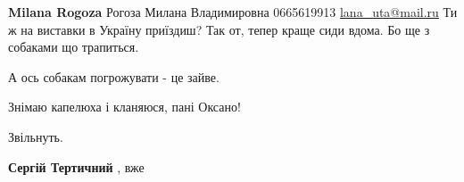 \begin{itemize}
\begin{itemize}
 
\textbf{Milana Rogoza} Рогоза Милана Владимировна 0665619913 \url{lana_uta@mail.ru}
Ти ж на виставки в Україну приїздиш? Так от, тепер краще сиди вдома. Бо ще з собаками що трапиться.

 
А ось собакам погрожувати - це зайве.

\end{itemize}

 
Знімаю капелюха і кланяюся, пані Оксано!

 
Звільнуть.

\begin{itemize}
 
\textbf{Сергій Тертичний} , вже
\end{itemize}

 




\end{itemize}

